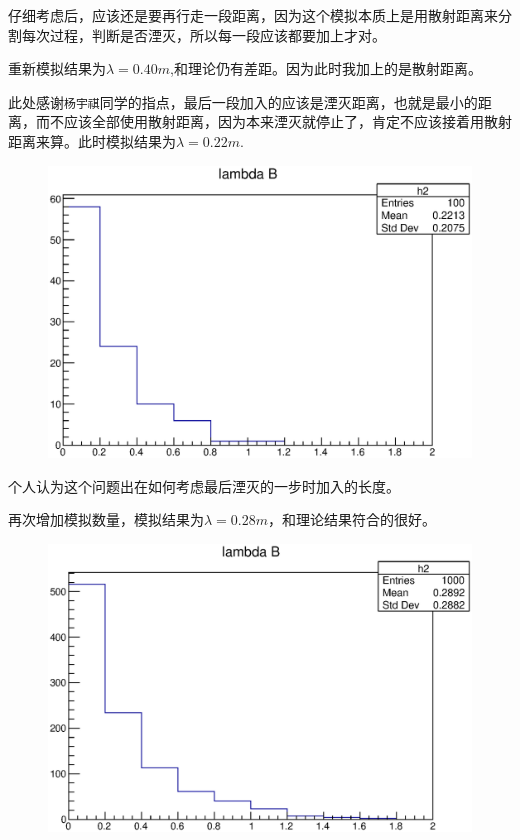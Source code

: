 \documentclass[UTF8]{ctexart}
\begin{document}
仔细考虑后，应该还是要再行走一段距离，因为这个模拟本质上是用散射距离来分割每次过程，判断是否湮灭，所以每一段应该都要加上才对。

重新模拟结果为$\lambda=0.40m$,和理论仍有差距。因为此时我加上的是散射距离。

此处感谢\texttt{杨宇祺}同学的指点，最后一段加入的应该是湮灭距离，也就是最小的距离，而不应该全部使用散射距离，因为本来湮灭就停止了，肯定不应该接着用散射距离来算。此时模拟结果为$\lambda=0.22m$.

\begin{figure}[h]
\includegraphics[width=.8\textwidth]{distributionN100.eps}
\end{figure}

个人认为这个问题出在如何考虑最后湮灭的一步时加入的长度。

再次增加模拟数量，模拟结果为$\lambda=0.28m$，和理论结果符合的很好。

\begin{figure}[h]
\includegraphics[width=.8\textwidth]{distributionN1000.eps}
\end{figure}
\end{document}
